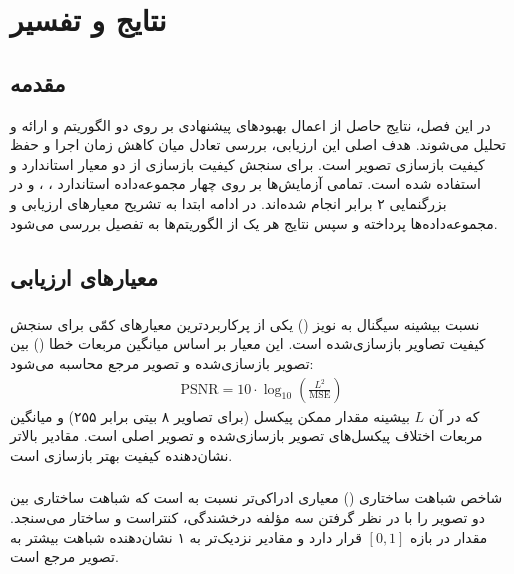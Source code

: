 \chapter{نتایج و تفسیر}
\label{chp:results}
\section{مقدمه}
در این فصل، نتایج حاصل از اعمال بهبودهای پیشنهادی بر روی دو الگوریتم  و  ارائه و تحلیل می‌شوند. هدف اصلی این ارزیابی، بررسی تعادل میان کاهش زمان اجرا و حفظ کیفیت بازسازی تصویر است. برای سنجش کیفیت بازسازی از دو معیار استاندارد  و  استفاده شده است. تمامی آزمایش‌ها بر روی چهار مجموعه‌داده استاندارد ، ،  و  در بزرگنمایی ۲ برابر انجام شده‌اند. در ادامه ابتدا به تشریح معیارهای ارزیابی و مجموعه‌داده‌ها پرداخته و سپس نتایج هر یک از الگوریتم‌ها به تفصیل بررسی می‌شود.

\section{معیارهای ارزیابی}

\subsection{}
نسبت بیشینه سیگنال به نویز () یکی از پرکاربردترین معیارهای کمّی برای سنجش کیفیت تصاویر بازسازی‌شده است. این معیار بر اساس میانگین مربعات خطا () بین تصویر بازسازی‌شده و تصویر مرجع محاسبه می‌شود:
\begin{align}
\text{PSNR} = 10 \cdot \log_{10} \left( \frac{L^2}{\text{MSE}} \right)
\end{align}
که در آن $L$ بیشینه مقدار ممکن پیکسل (برای تصاویر ۸ بیتی برابر ۲۵۵) و  میانگین مربعات اختلاف پیکسل‌های تصویر بازسازی‌شده و تصویر اصلی است. مقادیر بالاتر  نشان‌دهنده کیفیت بهتر بازسازی است.

\subsection{}
شاخص شباهت ساختاری () معیاری ادراکی‌تر نسبت به  است که شباهت ساختاری بین دو تصویر را با در نظر گرفتن سه مؤلفه درخشندگی، کنتراست و ساختار می‌سنجد. مقدار  در بازه $[0, 1]$ قرار دارد و مقادیر نزدیک‌تر به ۱ نشان‌دهنده شباهت بیشتر به تصویر مرجع است.

